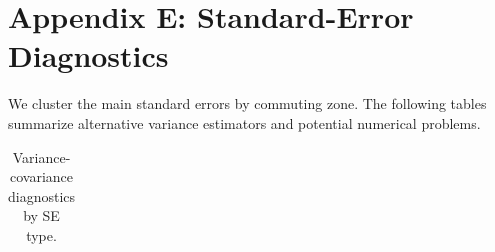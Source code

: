 \documentclass[
  11pt,
]{article}
\begin{document}
\section{Appendix E: Standard-Error
Diagnostics}\label{appendix-e-standard-error-diagnostics}

We cluster the main standard errors by commuting zone. The following
tables summarize alternative variance estimators and potential numerical
problems.

{

\begin{longtable}[]{@{}
  >{\raggedright\arraybackslash}p{}
  >{\raggedright\arraybackslash}p{}
  >{\raggedleft\arraybackslash}p{}
  >{\raggedleft\arraybackslash}p{}
  >{\raggedleft\arraybackslash}p{}
  >{\raggedright\arraybackslash}p{}@{}}

\caption{\label{tbl-vcov-diagnostics}Variance-covariance diagnostics by
SE type.}

\tabularnewline


\end{longtable}}
\end{document}
